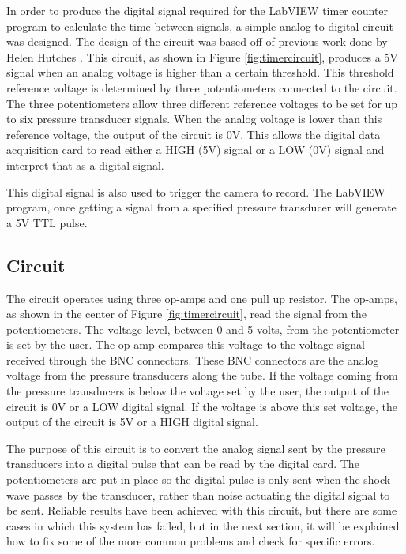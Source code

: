 In order to produce the digital signal required for the LabVIEW timer counter program to calculate the time between signals, a simple analog to digital circuit was designed. The design of the circuit was based off of previous work done by Helen Hutches \cite{Hutchens2015}. This circuit, as shown in Figure \ref{fig:timercircuit}, produces a 5V signal when an analog voltage is higher than a certain threshold. This threshold reference voltage is determined by three potentiometers connected to the circuit. The three potentiometers allow three different reference voltages to be set for up to six pressure transducer signals. When the analog voltage is lower than this reference voltage, the output of the circuit is 0V. This allows the digital data acquisition card to read either a HIGH (5V) signal or a LOW (0V) signal and interpret that as a digital signal. 

This digital signal is also used to trigger the camera to record. The LabVIEW program, once getting a signal from a specified pressure transducer will generate a 5V TTL pulse. 


\subsection{Circuit}
The circuit operates using three op-amps and one pull up resistor. The op-amps, as shown in the center of Figure \ref{fig:timercircuit}, read the signal from the potentiometers. The voltage level, between 0 and 5 volts, from the potentiometer is set by the user. The op-amp compares this voltage to the voltage signal received through the BNC connectors. These BNC connectors are the analog voltage from the pressure transducers along the tube. If the voltage coming from the pressure transducers is below the voltage set by the user, the output of the circuit is 0V or a LOW digital signal. If the voltage is above this set voltage, the output of the circuit is 5V or a HIGH digital signal. 

The purpose of this circuit is to convert the analog signal sent by the pressure transducers into a digital pulse that can be read by the digital card. The potentiometers are put in place so the digital pulse is only sent when the shock wave passes by the transducer, rather than noise actuating the digital signal to be sent. Reliable results have been achieved with this circuit, but there are some cases in which this system has failed, but in the next section, it will be explained how to fix some of the more common problems and check for specific errors.


